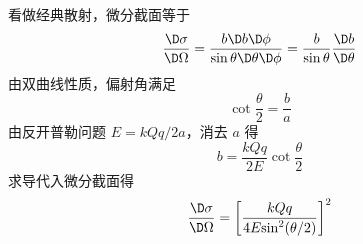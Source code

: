 看做经典散射，微分截面等于
\begin{equation}
\frac{{\D \sigma }}{{\D \Omega }} = \frac{{b\D b\D \phi }}{{\sin \theta \D \theta \D \phi }} = \frac{b}{{\sin \theta }}\frac{{\D b}}{{\D \theta }}
\end{equation}
由双曲线性质，偏射角满足
\begin{equation}
\cot{\frac{\theta }{2}}= \frac{b}{a}
\end{equation}
由反开普勒问题  $E = {{kQq}}/{{2a}}$，消去 $a$ 得
\begin{equation}
b = \frac{{kQq}}{{2E}}\cot {\frac{\theta }{2}}
\end{equation}
求导代入微分截面得
\begin{equation}
\frac{{\D \sigma }}{{\D \Omega }} = {\left[ {\frac{{kQq}}{{4E{{\sin }^2}(\theta /2)}}} \right]^2}
\end{equation}
